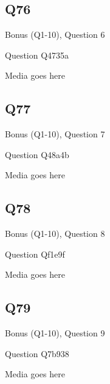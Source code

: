 \documentclass[11pt]{beamer}
\begin{document}
\subsection*{Q76}
\begin{frame}[t]{Bonus (Q1-10), Question 6}
\vspace{2em}
\begin{block}{Question}
Q4735a
\end{block}
\begin{center}
Media goes here
\end{center}
\end{frame}
    

\subsection*{Q77}
\begin{frame}[t]{Bonus (Q1-10), Question 7}
\vspace{2em}
\begin{block}{Question}
Q48a4b
\end{block}
\begin{center}
Media goes here
\end{center}
\end{frame}
    

\subsection*{Q78}
\begin{frame}[t]{Bonus (Q1-10), Question 8}
\vspace{2em}
\begin{block}{Question}
Qf1e9f
\end{block}
\begin{center}
Media goes here
\end{center}
\end{frame}
    

\subsection*{Q79}
\begin{frame}[t]{Bonus (Q1-10), Question 9}
\vspace{2em}
\begin{block}{Question}
Q7b938
\end{block}
\begin{center}
Media goes here
\end{center}
\end{frame}
    
\end{document}

